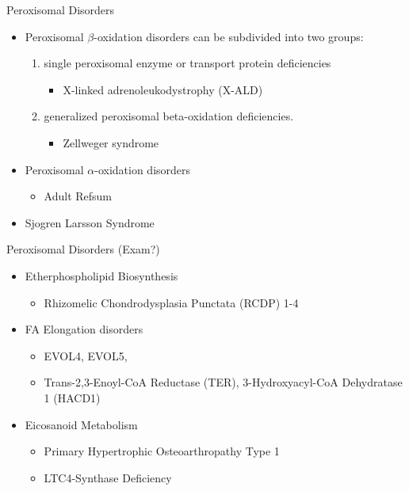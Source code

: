 \documentclass[presentation, smaller]{beamer}
\begin{document}
\begin{frame}[label={sec:org22d6ad9}]{Peroxisomal Disorders}
\begin{itemize}
\item Peroxisomal \(\beta\)-oxidation disorders can be subdivided into two groups:
\begin{enumerate}
\item single peroxisomal enzyme or transport protein deficiencies
\begin{itemize}
\item X-linked adrenoleukodystrophy (X-ALD)
\end{itemize}
\item generalized peroxisomal beta-oxidation deficiencies.
\begin{itemize}
\item Zellweger syndrome
\end{itemize}
\end{enumerate}

\item Peroxisomal \(\alpha\)-oxidation disorders
\begin{itemize}
\item Adult Refsum
\end{itemize}
\item Sjogren Larsson Syndrome
\end{itemize}
\end{frame}

\begin{frame}[label={sec:orgdd7a7d8}]{Peroxisomal Disorders (Exam?)}
\begin{itemize}
\item Etherphospholipid Biosynthesis
\begin{itemize}
\item Rhizomelic Chondrodysplasia Punctata (RCDP) 1-4
\end{itemize}
\item FA Elongation disorders
\begin{itemize}
\item EVOL4, EVOL5,
\item Trans-2,3-Enoyl-CoA Reductase (TER), 3-Hydroxyacyl-CoA Dehydratase 1 (HACD1)
\end{itemize}
\item Eicosanoid Metabolism
\begin{itemize}
\item Primary Hypertrophic Osteoarthropathy Type 1
\item LTC4-Synthase Deficiency
\end{itemize}
\end{itemize}
\end{frame}
\end{document}
